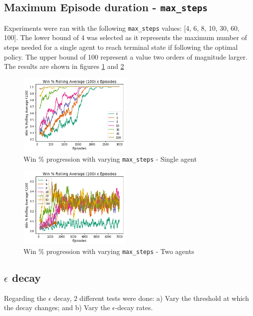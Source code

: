 \documentclass[11pt]{article}
\begin{document}
    \subsection{Maximum Episode duration - \texttt{max\_steps}}
        Experiments were ran with the following \texttt{max\_steps} values: [4, 6, 8, 10, 30, 60, 100]. The lower bound of 4 was selected as it represents the maximum number of steps needed for a single agent to reach terminal state if following the optimal policy. The upper bound of 100 represent a value two orders of magnitude larger. The results are shown in figures \ref{fig:exp5:win_percent} and \ref{fig:exp5:win_percent_two}

        \begin{figure}[h]
            \includegraphics[height=4cm]{Images/exp_5/1_win_percent.png}
            \caption{Win \% progression with varying \texttt{max\_steps} - Single agent}
            \label{fig:exp5:win_percent}
        \end{figure}

        \begin{figure}[h]
            \includegraphics[height=4cm]{Images/exp_5/2_win_percent.png}
            \caption{Win \% progression with varying \texttt{max\_steps} - Two agents}
            \label{fig:exp5:win_percent_two}
        \end{figure}

    \subsection{$\epsilon$ decay}
        Regarding the $\epsilon$ decay, 2 different tests were done: a) Vary the threshold at which the decay changes; and b) Vary the $\epsilon$-decay rates.
\end{document}
